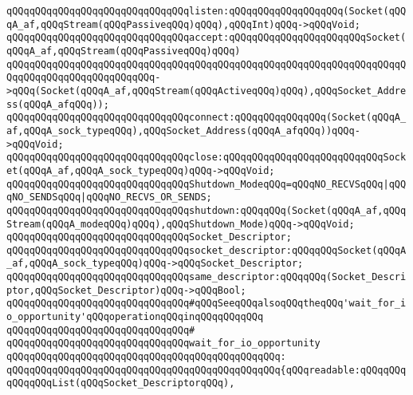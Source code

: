 \verb|qQQqqQQqqQQqqQQqqQQqqQQqqQQqqQQqlisten:qQQqqQQqqQQqqQQqqQQq(Socket(qQQqA_af,qQQqStream(qQQqPassiveqQQq)qQQq),qQQqInt)qQQq->qQQqVoid;|\newline
\verb|qQQqqQQqqQQqqQQqqQQqqQQqqQQqqQQqaccept:qQQqqQQqqQQqqQQqqQQqqQQqSocket(qQQqA_af,qQQqStream(qQQqPassiveqQQq)qQQq)|\newline
\verb|qQQqqQQqqQQqqQQqqQQqqQQqqQQqqQQqqQQqqQQqqQQqqQQqqQQqqQQqqQQqqQQqqQQqqQQqqQQqqQQqqQQqqQQqqQQqqQQq->qQQq(Socket(qQQqA_af,qQQqStream(qQQqActiveqQQq)qQQq),qQQqSocket_Address(qQQqA_afqQQq));|\newline
\verb|qQQqqQQqqQQqqQQqqQQqqQQqqQQqqQQqconnect:qQQqqQQqqQQqqQQq(Socket(qQQqA_af,qQQqA_sock_typeqQQq),qQQqSocket_Address(qQQqA_afqQQq))qQQq->qQQqVoid;|\newline
\verb|qQQqqQQqqQQqqQQqqQQqqQQqqQQqqQQqclose:qQQqqQQqqQQqqQQqqQQqqQQqqQQqSocket(qQQqA_af,qQQqA_sock_typeqQQq)qQQq->qQQqVoid;|\newline
\newline
\verb|qQQqqQQqqQQqqQQqqQQqqQQqqQQqqQQqShutdown_ModeqQQq=qQQqNO_RECVSqQQq|\verb#|qQQqNO_SENDSqQQq|qQQqNO_RECVS_OR_SENDS;#\newline
\verb|qQQqqQQqqQQqqQQqqQQqqQQqqQQqqQQqshutdown:qQQqqQQq(Socket(qQQqA_af,qQQqStream(qQQqA_modeqQQq)qQQq),qQQqShutdown_Mode)qQQq->qQQqVoid;|\newline
\newline
\verb|qQQqqQQqqQQqqQQqqQQqqQQqqQQqqQQqSocket_Descriptor;|\newline
\verb|qQQqqQQqqQQqqQQqqQQqqQQqqQQqqQQqsocket_descriptor:qQQqqQQqSocket(qQQqA_af,qQQqA_sock_typeqQQq)qQQq->qQQqSocket_Descriptor;|\newline
\verb|qQQqqQQqqQQqqQQqqQQqqQQqqQQqqQQqsame_descriptor:qQQqqQQq(Socket_Descriptor,qQQqSocket_Descriptor)qQQq->qQQqBool;|\newline
\newline
\verb|qQQqqQQqqQQqqQQqqQQqqQQqqQQqqQQq#qQQqSeeqQQqalsoqQQqtheqQQq'wait_for_io_opportunity'qQQqoperationqQQqinqQQqqQQqqQQq|\newline
\verb|qQQqqQQqqQQqqQQqqQQqqQQqqQQqqQQq#|\newline
\verb|qQQqqQQqqQQqqQQqqQQqqQQqqQQqqQQqwait_for_io_opportunity|\newline
\verb|qQQqqQQqqQQqqQQqqQQqqQQqqQQqqQQqqQQqqQQqqQQqqQQq:|\newline
\verb|qQQqqQQqqQQqqQQqqQQqqQQqqQQqqQQqqQQqqQQqqQQqqQQq{qQQqreadable:qQQqqQQqqQQqqQQqList(qQQqSocket_DescriptorqQQq),|\newline

